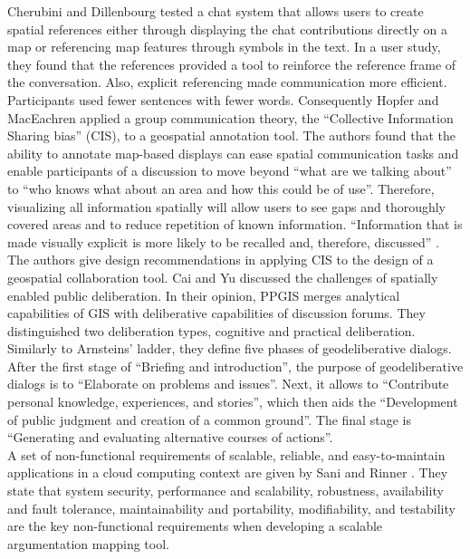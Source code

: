 Cherubini and Dillenbourg \cite{Cherubini2007_shared_maps} tested a chat system that allows users to create spatial references either through displaying the chat contributions directly on a map or referencing map features through symbols in the text. In a user study, they found that the references provided a tool to reinforce the reference frame of the conversation. Also, explicit referencing made communication more efficient. Participants used fewer sentences with fewer words. Consequently Hopfer and MacEachren \cite{Hopfer2007_Communication} applied a group communication theory, the ``Collective Information Sharing bias'' (CIS), to a geospatial annotation tool. The authors found that the ability to annotate map-based displays can ease spatial communication tasks and enable participants of a discussion to move beyond ``what are we talking about'' to ``who knows what about an area and how this could be of use''. Therefore, visualizing all information spatially will allow users to see gaps and thoroughly covered areas and to reduce repetition of known information. ``Information that is made visually explicit is more likely to be recalled and, therefore, discussed'' \cite{Hopfer2007_Communication}. The authors give design recommendations in applying CIS to the design of a geospatial collaboration tool. Cai and Yu \cite{Cai2009_spatial_annotation_deliberation} discussed the challenges of spatially enabled public deliberation. In their opinion, PPGIS merges analytical capabilities of GIS with deliberative capabilities of discussion forums. They distinguished two deliberation types, cognitive and practical deliberation. Similarly to Arnsteins' ladder, they define five phases of geodeliberative dialogs. After the first stage of ``Briefing and introduction'', the purpose of geodeliberative dialogs is to ``Elaborate on problems and issues''. Next, it allows to ``Contribute personal knowledge, experiences, and stories'', which then aids the ``Development of public judgment and creation of a common ground''. The final stage is ``Generating and evaluating alternative courses of actions''.\\
A set of non-functional requirements of scalable, reliable, and easy-to-maintain applications in a cloud computing context are given by Sani and Rinner \cite{Sani2011_Scalable_Argumap}. They state that system security, performance and scalability, robustness, availability and fault tolerance, maintainability and portability, modifiability, and testability are the key non-functional requirements when developing a scalable argumentation mapping tool.\\
